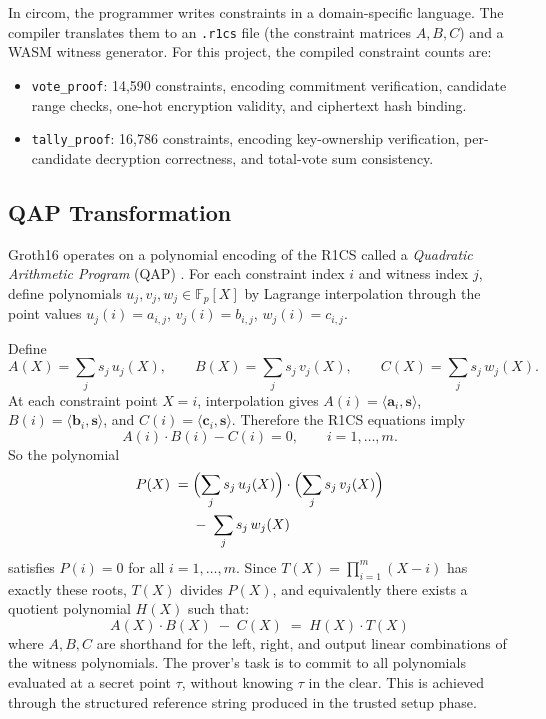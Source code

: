 In circom, the programmer writes constraints in a domain-specific language. The compiler translates them to an \texttt{.r1cs} file (the constraint matrices $A, B, C$) and a WASM witness generator. For this project, the compiled constraint counts are:
\begin{itemize}
    \item \texttt{vote\_proof}: 14{,}590 constraints, encoding commitment verification, candidate range checks, one-hot encryption validity, and ciphertext hash binding.
    \item \texttt{tally\_proof}: 16{,}786 constraints, encoding key-ownership verification, per-candidate decryption correctness, and total-vote sum consistency.
\end{itemize}

\subsection{QAP Transformation}

Groth16 operates on a polynomial encoding of the R1CS called a \emph{Quadratic Arithmetic Program} (QAP) \cite{gennaro2013}. For each constraint index $i$ and witness index $j$, define polynomials $u_j, v_j, w_j \in \mathbb{F}_p[X]$ by Lagrange interpolation through the point values $u_j(i) = a_{i,j}$, $v_j(i) = b_{i,j}$, $w_j(i) = c_{i,j}$.

Define
\begin{equation*}
A(X)=\sum_j s_j\,u_j(X), \qquad B(X)=\sum_j s_j\,v_j(X), \qquad C(X)=\sum_j s_j\,w_j(X).
\end{equation*}
At each constraint point $X=i$, interpolation gives $A(i)=\langle \mathbf{a}_i,\mathbf{s}\rangle$, $B(i)=\langle \mathbf{b}_i,\mathbf{s}\rangle$, and $C(i)=\langle \mathbf{c}_i,\mathbf{s}\rangle$. Therefore the R1CS equations imply
\begin{equation*}
A(i)\cdot B(i)-C(i)=0, \qquad i=1,\dots,m.
\end{equation*}
So the polynomial
\begin{equation}
\begin{split}
    P(X) \;=\; &\Bigl(\sum_j s_j\, u_j(X)\Bigr) \cdot \Bigl(\sum_j s_j\, v_j(X)\Bigr) \\
               &-\; \sum_j s_j\, w_j(X)
\end{split}
\end{equation}
satisfies $P(i)=0$ for all $i=1,\dots,m$. Since $T(X)=\prod_{i=1}^{m}(X-i)$ has exactly these roots, $T(X)$ divides $P(X)$, and equivalently there exists a quotient polynomial $H(X)$ such that:
\begin{equation}
    A(X) \cdot B(X) \;-\; C(X) \;=\; H(X) \cdot T(X)
\end{equation}
where $A, B, C$ are shorthand for the left, right, and output linear combinations of the witness polynomials. The prover's task is to commit to all polynomials evaluated at a secret point $\tau$, without knowing $\tau$ in the clear. This is achieved through the structured reference string produced in the trusted setup phase.

